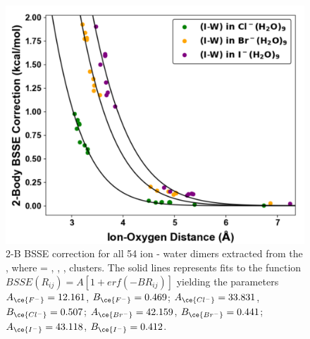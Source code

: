 \begin{figure}[t]
\uwsinglespace
\centering
\begin{adjustbox}{max size={.6\textwidth}{.6\textheight}}
\includegraphics[width=\textwidth]{Figures/Chapter_3/figure_11.pdf}
\end{adjustbox}
\begin{spacing}{1.0}
\caption[2-B BSSE correction for all 54 ion - water dimers extracted from the , where  = , , , clusters.]{2-B BSSE correction for all 54 ion - water dimers extracted from the , where  = , , , clusters. The solid lines represents fits to the function $BSSE(R_{ij})=A[1+erf(-BR_{ij})]$ yielding the parameters  $A_{\ce{F^-}} = 12.161$, $B_{\ce{F^-}} = 0.469$; $A_{\ce{Cl^-}} = 33.831$, $B_{\ce{Cl^-}} =0.507$; $A_{\ce{Br^-}} = 42.159$, $B_{\ce{Br^-}} = 0.441$; $A_{\ce{I^-}} = 43.118$, $B_{\ce{I^-}} = 0.412$.}\label{fig:MBE_II_11}
\end{spacing}
\end{figure}